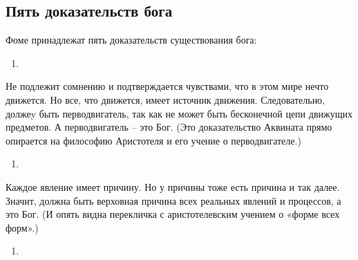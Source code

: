 \documentclass[
]{article}
\providecommand{\tightlist}{%
  \setlength{\itemsep}{0pt}\setlength{\parskip}{0pt}}
\begin{document}
\hypertarget{ux43fux44fux442ux44c-ux434ux43eux43aux430ux437ux430ux442ux435ux43bux44cux441ux442ux432-ux431ux43eux433ux430}{%
\subsection{Пять доказательств
бога}\label{ux43fux44fux442ux44c-ux434ux43eux43aux430ux437ux430ux442ux435ux43bux44cux441ux442ux432-ux431ux43eux433ux430}}

Фоме принадлежат пять доказательств существования бога:

\begin{enumerate}
\def\labelenumi{\arabic{enumi}.}
\item
\end{enumerate}

Не подлежит сомнению и подтверждается чувствами, что в этом мире нечто
движется. Но все, что движется, имеет источник движения. Следовательно,
должеy быть перводвигатель, так как не может быть бесконечной цепи
движущих предметов. А перводвигатель -- это Бог. (Это доказательство
Аквината прямо опирается на философию Аристотеля и его учение о
перводвигателе.)

\begin{enumerate}
\def\labelenumi{\arabic{enumi}.}
\setcounter{enumi}{1}
\item
\end{enumerate}

Каждое явление имеет причину. Но у причины тоже есть причина и так
далее. Значит, должна быть верховная причина всех реальных явлений и
процессов, а это Бог. (И опять видна перекличка с аристотелевским
учением о «форме всех форм».)

\begin{enumerate}
\def\labelenumi{\arabic{enumi}.}
\setcounter{enumi}{2}
\item
\end{enumerate}
\end{document}
